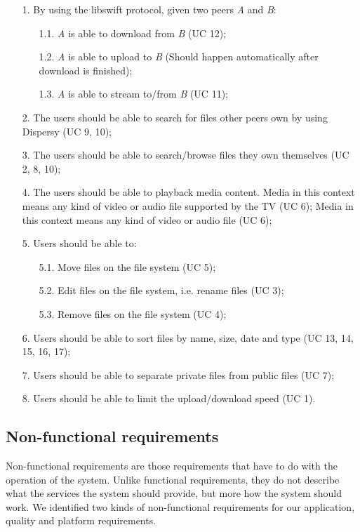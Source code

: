 \begin{itemize}
\item[1.] By using the libswift protocol, given two peers \textit{A} and \textit{B}:
	\begin{itemize}
	\item[1.1.] \textit{A} is able to download from \textit{B} (UC 12);
	\item[1.2.] \textit{A} is able to upload to \textit{B} (Should happen automatically after download is finished);
	\item[1.3.] \textit{A} is able to stream to/from \textit{B} (UC 11);
	\end{itemize}
\item[2.] The users should be able to search for files other peers own by using Dispersy\cite{dispersy} (UC 9, 10);
\item[3.] The users should be able to search/browse files they own themselves (UC 2, 8, 10);
\item[4.] The users should be able to playback media content. 
		  Media in this context means any kind of video or audio file supported by the TV (UC 6);
		  Media in this context means any kind of video or audio file (UC 6);
\item[5.] Users should be able to:
	\begin{itemize}
	\item[5.1.] Move files on the file system (UC 5);
	\item[5.2.] Edit files on the file system, i.e. rename files (UC 3);
	\item[5.3.] Remove files on the file system (UC 4);
	
	\end{itemize}
\item[6.] Users should be able to sort files by name, size, date and type (UC 13, 14, 15, 16, 17); 
\item[7.] Users should be able to separate private files from public files (UC 7);
\item[8.] Users should be able to limit the upload/download speed (UC 1). 
\end{itemize}

\subsection{Non-functional requirements}
Non-functional requirements are those requirements that have to do with the operation of the system. 
Unlike functional requirements, they do not describe what the services the system should provide, 
but more how the system should work. We identified two kinds of non-functional requirements for our application, 
quality and platform requirements.

